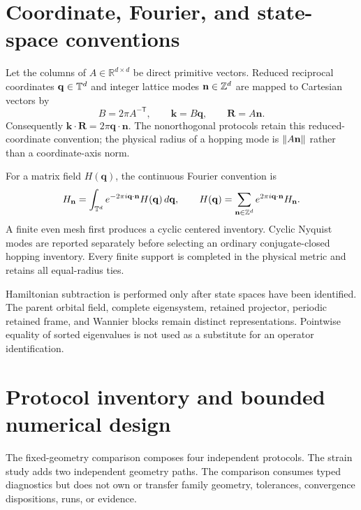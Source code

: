 



\section{Coordinate, Fourier, and state-space conventions}
\label{app:conventions}

Let the columns of $A\in\mathbb R^{d\times d}$ be direct primitive vectors. Reduced
reciprocal coordinates $\mathbf q\in\mathbb T^d$ and integer lattice modes
$\mathbf n\in\mathbb Z^d$ are mapped to Cartesian vectors by
\begin{equation}
 B=2\pi A^{-\mathsf T},\qquad
 \mathbf k=B\mathbf q,\qquad
 \mathbf R=A\mathbf n.
 \label{eq:app-direct-reciprocal-map}
\end{equation}
Consequently $\mathbf k\cdot\mathbf R=2\pi\mathbf q\cdot\mathbf n$. The
nonorthogonal protocols retain this reduced-coordinate convention; the physical radius
of a hopping mode is $\left\lVert A\mathbf n\right\rVert$ rather than a coordinate-axis norm.

For a matrix field $H(\mathbf q)$, the continuous Fourier convention is
\begin{equation}
 H_{\mathbf n}=\int_{\mathbb T^d}
 e^{-2\pi i\mathbf q\cdot\mathbf n}H(\mathbf q)\,d\mathbf q,
 \qquad
 H(\mathbf q)=\sum_{\mathbf n\in\mathbb Z^d}
 e^{2\pi i\mathbf q\cdot\mathbf n}H_{\mathbf n}.
 \label{eq:app-fourier-convention}
\end{equation}
A finite even mesh first produces a cyclic centered inventory. Cyclic Nyquist modes are
reported separately before selecting an ordinary conjugate-closed hopping inventory.
Every finite support is completed in the physical metric and retains all equal-radius
ties.

Hamiltonian subtraction is performed only after state spaces have been identified. The
parent orbital field, complete eigensystem, retained projector, periodic retained frame,
and Wannier blocks remain distinct representations. Pointwise equality of sorted
eigenvalues is not used as a substitute for an operator identification.

\section{Protocol inventory and bounded numerical design}
\label{app:protocols}

The fixed-geometry comparison composes four independent protocols. The strain study
adds two independent geometry paths. The comparison consumes typed diagnostics but does
not own or transfer family geometry, tolerances, convergence dispositions, runs, or
evidence.

